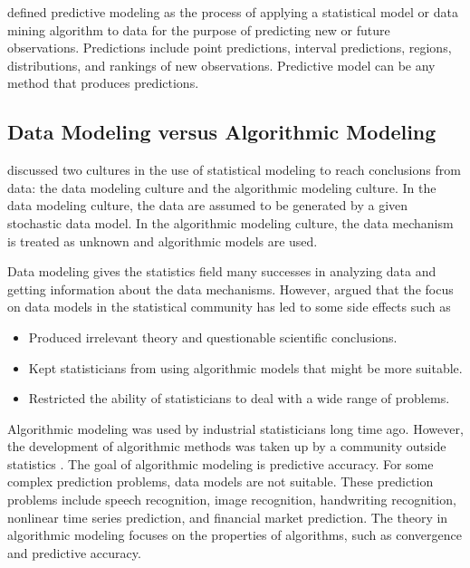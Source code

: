 \documentclass[]{book}
\theoremstyle{definition}
\theoremstyle{definition}
\theoremstyle{definition}
\theoremstyle{remark}
\begin{document}
\citet{shmueli2010model} defined predictive modeling as the process of
applying a statistical model or data mining algorithm to data for the
purpose of predicting new or future observations. Predictions include
point predictions, interval predictions, regions, distributions, and
rankings of new observations. Predictive model can be any method that
produces predictions.

\subsection{Data Modeling versus Algorithmic
Modeling}\label{data-modeling-versus-algorithmic-modeling}

\citet{breiman2001modeling} discussed two cultures in the use of
statistical modeling to reach conclusions from data: the data modeling
culture and the algorithmic modeling culture. In the data modeling
culture, the data are assumed to be generated by a given stochastic data
model. In the algorithmic modeling culture, the data mechanism is
treated as unknown and algorithmic models are used.

Data modeling gives the statistics field many successes in analyzing
data and getting information about the data mechanisms. However,
\citet{breiman2001modeling} argued that the focus on data models in the
statistical community has led to some side effects such as

\begin{itemize}
\item
  Produced irrelevant theory and questionable scientific conclusions.
\item
  Kept statisticians from using algorithmic models that might be more
  suitable.
\item
  Restricted the ability of statisticians to deal with a wide range of
  problems.
\end{itemize}

Algorithmic modeling was used by industrial statisticians long time ago.
However, the development of algorithmic methods was taken up by a
community outside statistics \citep{breiman2001modeling}. The goal of
algorithmic modeling is predictive accuracy. For some complex prediction
problems, data models are not suitable. These prediction problems
include speech recognition, image recognition, handwriting recognition,
nonlinear time series prediction, and financial market prediction. The
theory in algorithmic modeling focuses on the properties of algorithms,
such as convergence and predictive accuracy.
\end{document}
